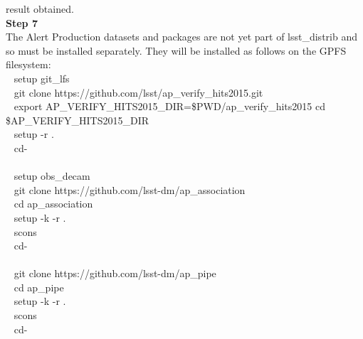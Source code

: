 result obtained.\\[2\baselineskip]\textbf{Step 7}\\
The Alert Production datasets and packages are not yet part of
lsst\_distrib and so must be installed separately. They will be
installed as follows on the GPFS
filesystem:\\[2\baselineskip]\hspace*{0.333em} ~ setup git\_lfs\\
\hspace*{0.333em} ~ git clone
https://github.com/lsst/ap\_verify\_hits2015.git\\[2\baselineskip]\hspace*{0.333em}
~ export AP\_VERIFY\_HITS2015\_DIR=\$PWD/ap\_verify\_hits2015 cd
\$AP\_VERIFY\_HITS2015\_DIR\\
\hspace*{0.333em} ~ setup -r .\\
\hspace*{0.333em} ~ cd-\\
\hspace*{0.333em} ~\\
\hspace*{0.333em} ~ setup obs\_decam\\
\hspace*{0.333em} ~ git clone
https://github.com/lsst-dm/ap\_association\\
\hspace*{0.333em} ~ cd ap\_association\\
\hspace*{0.333em} ~ setup -k -r .\\
\hspace*{0.333em} ~ scons\\
\hspace*{0.333em} ~ cd-\\
\hspace*{0.333em} ~\\
\hspace*{0.333em} ~ git clone https://github.com/lsst-dm/ap\_pipe\\
\hspace*{0.333em} ~ cd ap\_pipe\\
\hspace*{0.333em} ~ setup -k -r .\\
\hspace*{0.333em} ~ scons\\
\hspace*{0.333em} ~ cd-\\
\hspace*{0.333em} ~\\
